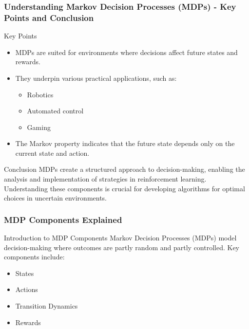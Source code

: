 \documentclass[aspectratio=169]{beamer}
\begin{document}
\begin{frame}[fragile]
    \frametitle{Understanding Markov Decision Processes (MDPs) - Key Points and Conclusion}
    \begin{block}{Key Points}
        \begin{itemize}
            \item MDPs are suited for environments where decisions affect future states and rewards.
            \item They underpin various practical applications, such as:
            \begin{itemize}
                \item Robotics
                \item Automated control
                \item Gaming
            \end{itemize}
            \item The Markov property indicates that the future state depends only on the current state and action.
        \end{itemize}
    \end{block}

    \begin{block}{Conclusion}
        MDPs create a structured approach to decision-making, enabling the analysis and implementation of strategies in reinforcement learning. Understanding these components is crucial for developing algorithms for optimal choices in uncertain environments.
    \end{block}
\end{frame}

\begin{frame}[fragile]
    \frametitle{MDP Components Explained}
    \begin{block}{Introduction to MDP Components}
        Markov Decision Processes (MDPs) model decision-making where outcomes are partly random and partly controlled. Key components include:
        \begin{itemize}
            \item States
            \item Actions
            \item Transition Dynamics
            \item Rewards
        \end{itemize}
    \end{block}
\end{frame}
\end{document}
